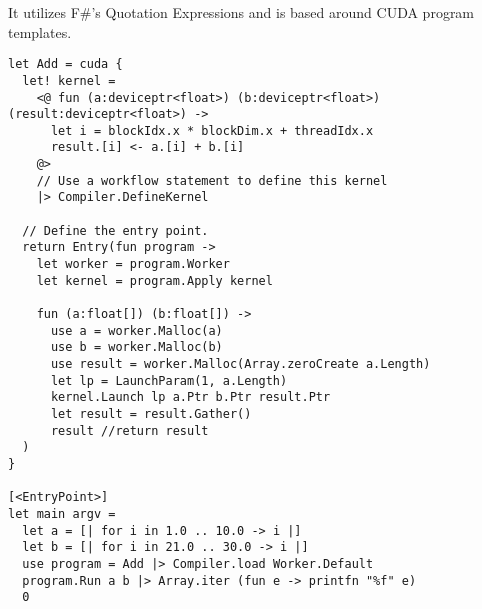 It utilizes F\#'s Quotation Expressions\cite{ms:quotations} and is based around CUDA program templates.

\begin{lstlisting}[caption=Alea.cuBase addition kernel, label=cubase_add]
let Add = cuda {
  let! kernel =
    <@ fun (a:deviceptr<float>) (b:deviceptr<float>) (result:deviceptr<float>) ->
      let i = blockIdx.x * blockDim.x + threadIdx.x
      result.[i] <- a.[i] + b.[i]
    @>
    // Use a workflow statement to define this kernel
    |> Compiler.DefineKernel

  // Define the entry point.
  return Entry(fun program ->
    let worker = program.Worker
    let kernel = program.Apply kernel

    fun (a:float[]) (b:float[]) ->
      use a = worker.Malloc(a)
      use b = worker.Malloc(b)
      use result = worker.Malloc(Array.zeroCreate a.Length)
      let lp = LaunchParam(1, a.Length)
      kernel.Launch lp a.Ptr b.Ptr result.Ptr
      let result = result.Gather()
      result //return result
  )
}

[<EntryPoint>]
let main argv = 
  let a = [| for i in 1.0 .. 10.0 -> i |]
  let b = [| for i in 21.0 .. 30.0 -> i |]
  use program = Add |> Compiler.load Worker.Default
  program.Run a b |> Array.iter (fun e -> printfn "%f" e)
  0
\end{lstlisting}